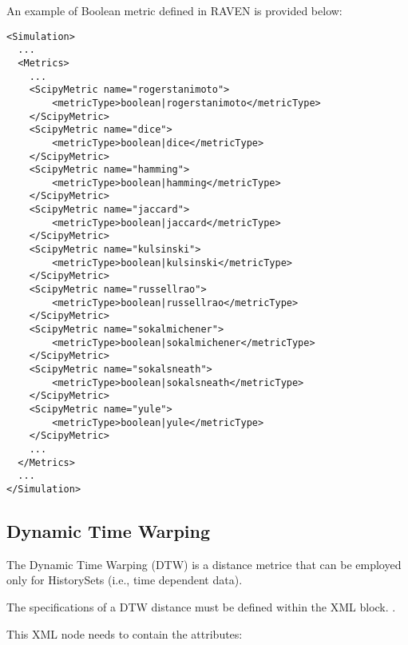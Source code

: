 An example of Boolean metric defined in RAVEN is provided below:
\begin{lstlisting}[style=XML]
<Simulation>
  ...
  <Metrics>
    ...
    <ScipyMetric name="rogerstanimoto">
        <metricType>boolean|rogerstanimoto</metricType>
    </ScipyMetric>
    <ScipyMetric name="dice">
        <metricType>boolean|dice</metricType>
    </ScipyMetric>
    <ScipyMetric name="hamming">
        <metricType>boolean|hamming</metricType>
    </ScipyMetric>
    <ScipyMetric name="jaccard">
        <metricType>boolean|jaccard</metricType>
    </ScipyMetric>
    <ScipyMetric name="kulsinski">
        <metricType>boolean|kulsinski</metricType>
    </ScipyMetric>
    <ScipyMetric name="russellrao">
        <metricType>boolean|russellrao</metricType>
    </ScipyMetric>
    <ScipyMetric name="sokalmichener">
        <metricType>boolean|sokalmichener</metricType>
    </ScipyMetric>
    <ScipyMetric name="sokalsneath">
        <metricType>boolean|sokalsneath</metricType>
    </ScipyMetric>
    <ScipyMetric name="yule">
        <metricType>boolean|yule</metricType>
    </ScipyMetric>
    ...
  </Metrics>
  ...
</Simulation>
\end{lstlisting}

\subsection{Dynamic Time Warping}
\label{subsection:DTW}
The Dynamic Time Warping (DTW) is a distance metrice that can be employed only for HistorySets (i.e., time dependent data).

The specifications of a DTW distance must be defined within the XML block.
.

This XML node needs to contain the attributes:


